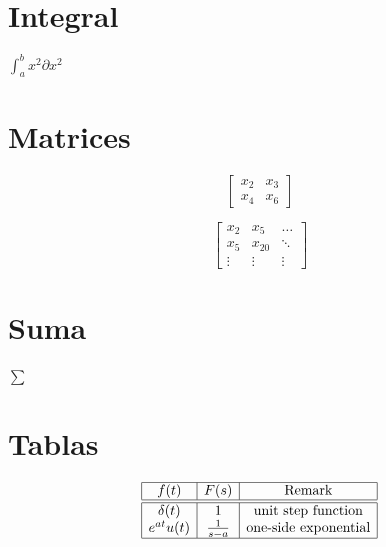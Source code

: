 \documentclass[letterpaper,12pt,oneside]{article}
\begin{document}
	\section*{Integral}
	$\int_{a}^{b} x^2 \partial x^2$\\


	\section*{Matrices}
	\[
	\begin{bmatrix}
	x_{2} & x_{3}\\
	x_{4} & x_{6}
	\end{bmatrix}
	\]

	\[
	\begin{bmatrix}
	x_{2} & x_{5} & \dots\\
	x_{5} & x_{20} & \ddots\\
	\vdots & \vdots & \vdots
	\end{bmatrix}
	\]

	\section*{Suma}
	$\sum$



	\section*{Tablas}
	\[
	\begin{array}{|c|c|c|}
	\hline
	f(t) & F(s) & \mbox{Remark}\\
	\hline\hline
	\delta(t) & 1 & \mbox{unit step function}\\
	e^{at}u(t) & \frac{1}{s-a} & \mbox{one-side exponential}\\
	\hline
	\end{array}
	\]
\end{document}
